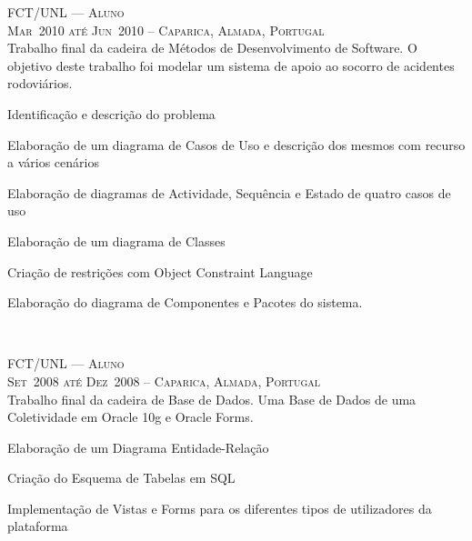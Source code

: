 \documentclass[a4paper,fontsize=10pt]{scrartcl} %
\begin{document}
\begin{minipage}[t]{0.5\textwidth}
\textsc{FCT/UNL --- Aluno}\\
\small\textsc{Mar~2010 até Jun~2010 -- Caparica, Almada, Portugal}\\ \normalsize
Trabalho final da cadeira de Métodos de Desenvolvimento de Software.
O objetivo deste trabalho foi modelar um sistema de apoio ao socorro de acidentes rodoviários.\\
\begin{inparaitem}
	\item[] Identificação e descrição do problema
	\item Elaboração de um diagrama de Casos de Uso e descrição dos mesmos com recurso a vários cenários
	\item Elaboração de diagramas de Actividade, Sequência e Estado de quatro casos de uso
	\item Elaboração de um diagrama de Classes
	\item Criação de restrições com Object Constraint Language
	\item Elaboração do diagrama de Componentes e Pacotes do sistema.
\end{inparaitem}
\\\par

\textsc{FCT/UNL --- Aluno}\\
\small\textsc{Set~2008 até Dez~2008 -- Caparica, Almada, Portugal}\\ \normalsize
Trabalho final da cadeira de Base de Dados. Uma Base de Dados de uma Coletividade em Oracle 10g e Oracle Forms.\\
\begin{inparaitem} 
	\item[] Elaboração de um Diagrama Entidade-Relação
	\item Criação do Esquema de Tabelas em SQL
	\item Implementação de Vistas e Forms para os diferentes tipos de utilizadores da plataforma
\end{inparaitem}
\\\par


\end{minipage}
\end{document}
